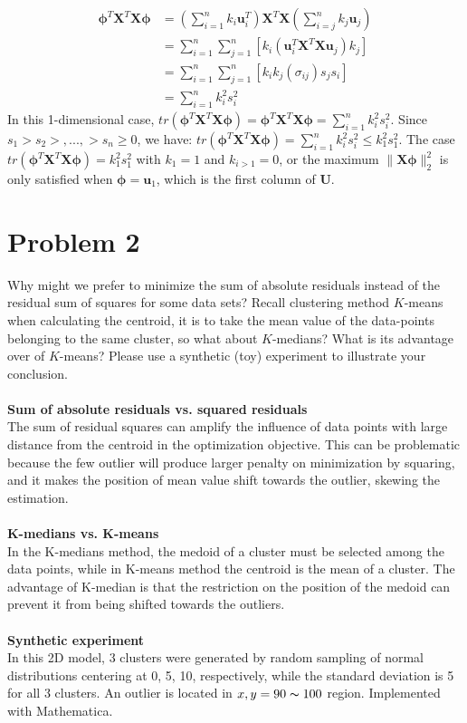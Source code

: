 \documentclass[11pt]{article}
\newcommand{\mtx}[1]{\mathbf{#1}}
\newcommand{\vct}[1]{\mathbf{#1}}
\def \mU {\mtx{U}}
\def \mX {\mtx{X}}
\def \vu {\vct{u}}
\def \vphi {\vct{\phi}}
\def \bold {\textbf}
\begin{document}
	\begin{equation}
	\begin{aligned}
	\vphi^T\mX^T\mX\vphi &= (\sum_{i=1}^{n}k_i\vu_i^T) \mX^T\mX (\sum_{i=j}^{n}k_j\vu_j) \\
	&= \sum_{i=1}^{n}\sum_{j=1}^{n}[k_i(\vu_i^T\mX^T\mX \vu_j)k_j]\\
	&= \sum_{i=1}^{n}\sum_{j=1}^{n}[k_ik_j(\sigma_{ij}) s_j s_i]\\
	&= \sum_{i=1}^{n}k_i^2 s_i^2
	\end{aligned}
	\end{equation}
	In this 1-dimensional case, $tr(\vphi^T\mX^T\mX\vphi)=\vphi^T\mX^T\mX\vphi=\sum_{i=1}^{n}k_i^2 s_i^2$. Since $s_1 > s_2 >,..., > s_n \geq 0$, we have: $tr(\vphi^T\mX^T\mX\vphi) = \sum_{i=1}^{n}k_i^2 s_i^2 \leq k_1^2 s_1^2$. The case $tr(\vphi^T\mX^T\mX\vphi) = k_1^2 s_1^2$ with $k_1=1$ and $k_{i>1}=0$, or the maximum $\|\mX \bm{\phi}\|^2_2$ is only satisfied when $\vphi=\vu_1$, which is the first column of $\mU$.
	\vspace{4cm}


	\section*{Problem 2}
	Why might we prefer to minimize the sum of absolute residuals instead of the residual sum of squares for some data sets? Recall clustering method $K$-means when calculating the centroid, it is to take the mean value of the data-points belonging to the same cluster, so what about $K$-medians? What is its advantage over of $K$-means? Please use a synthetic (toy) experiment to illustrate your conclusion.\\\\
	\bold{Sum of absolute residuals vs. squared residuals}\\
	The sum of residual squares can amplify the influence of data points with large distance from the centroid in the optimization objective. This can be problematic because the few outlier will produce larger penalty on minimization by squaring, and it makes the position of mean value shift towards the outlier, skewing the estimation.\\\\
	\bold{K-medians vs. K-means}\\
	In the K-medians method, the medoid of a cluster must be selected among the data points, while in K-means method the centroid is the mean of a cluster. The advantage of K-median is that the restriction on the position of the medoid can prevent it from being shifted towards the outliers.\\ \\
	\bold{Synthetic experiment}\\
	In this 2D model, 3 clusters were generated by random sampling of normal distributions centering at 0, 5, 10, respectively, while the standard deviation is 5 for all 3 clusters. An outlier is located in $x, y = 90\thicksim100$ region. Implemented with Mathematica.
	
\end{document}

